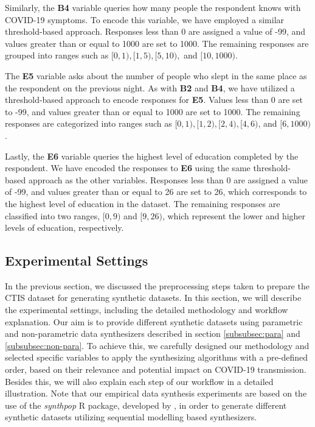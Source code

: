 Similarly, the \textbf{B4} variable queries how many people the respondent knows with COVID-19 symptoms. To encode this variable, we have employed a similar threshold-based approach. Responses less than 0 are assigned a value of -99, and values greater than or equal to 1000 are set to 1000. The remaining responses are grouped into ranges such as $[0,1), [1,5), [5,10),$ and $[10,1000)$.

The \textbf{E5} variable asks about the number of people who slept in the same place as the respondent on the previous night. As with \textbf{B2} and \textbf{B4}, we have utilized a threshold-based approach to encode responses for \textbf{E5}. Values less than 0 are set to -99, and values greater than or equal to 1000 are set to 1000. The remaining responses are categorized into ranges such as $[0,1), [1,2), [2,4), [4,6)$, and $[6,1000)$.

Lastly, the \textbf{E6} variable queries the highest level of education completed by the respondent. We have encoded the responses to \textbf{E6} using the same threshold-based approach as the other variables. Responses less than 0 are assigned a value of -99, and values greater than or equal to 26 are set to 26, which corresponds to the highest level of education in the dataset. The remaining responses are classified into two ranges, $[0,9)$ and $[9,26)$, which represent the lower and higher levels of education, respectively.




\subsection{Experimental Settings}
\label{subsec:exp-settings}
In the previous section, we discussed the preprocessing steps taken to prepare the CTIS dataset for generating synthetic datasets. In this section, we will describe the experimental settings, including the detailed methodology and workflow explanation. Our aim is to provide different synthetic datasets using parametric and non-parametric data synthesizers described in section \ref{subsubsec:para} and \ref{subsubsec:non-para}. To achieve this, we carefully designed our methodology and selected specific variables to apply the synthesizing algorithms with a pre-defined order, based on their relevance and potential impact on COVID-19 transmission. Besides this, we will also explain each step of our workflow in a detailed illustration. Note that our empirical data synthesis experiments are based on the use of the \textit{synthpop} R package, developed by \citet{nowok2016synthpop}, in order to generate different synthetic datasets utilizing sequential modelling based synthesizers.


